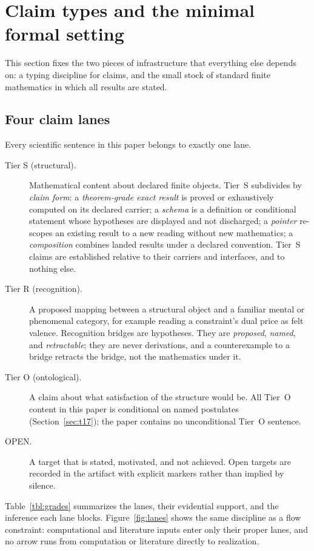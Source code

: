 \documentclass[11pt]{article}
\theoremstyle{definition}
\begin{document}
 \section{Claim types and the minimal formal setting}
\label{sec:claims}


This section fixes the two pieces of infrastructure that everything else
depends on: a typing discipline for claims, and the small stock of standard
finite mathematics in which all results are stated.

\subsection{Four claim lanes}
\label{sec:lanes}

Every scientific sentence in this paper belongs to exactly one lane.

\begin{description}
\item[Tier S (structural).] Mathematical content about declared finite
objects. Tier~S subdivides by \emph{claim form}: a \emph{theorem-grade exact
result} is proved or exhaustively computed on its declared carrier; a
\emph{schema} is a definition or conditional statement whose hypotheses are
displayed and not discharged; a \emph{pointer} re-scopes an existing result to
a new reading without new mathematics; a \emph{composition} combines landed
results under a declared convention. Tier~S claims are established relative to
their carriers and interfaces, and to nothing else.
\item[Tier R (recognition).] A proposed mapping between a structural object
and a familiar mental or phenomenal category, for example reading a
constraint's dual price as felt valence. Recognition bridges are hypotheses.
They are \emph{proposed}, \emph{named}, and \emph{retractable}; they are never
derivations, and a counterexample to a bridge retracts the bridge, not the
mathematics under it.
\item[Tier O (ontological).] A claim about what satisfaction of the structure
would be. All Tier~O content in this paper is conditional on named postulates
(Section~\ref{sec:t17}); the paper contains no unconditional Tier~O sentence.
\item[OPEN.] A target that is stated, motivated, and not achieved. Open
targets are recorded in the artifact with explicit markers rather than
implied by silence.
\end{description}

Table~\ref{tbl:grades} summarizes the lanes, their evidential support, and the
inference each lane blocks. Figure~\ref{fig:lanes} shows the same discipline as
a flow constraint: computational and literature inputs enter only their proper
lanes, and no arrow runs from computation or literature directly to
realization.
\end{document}

